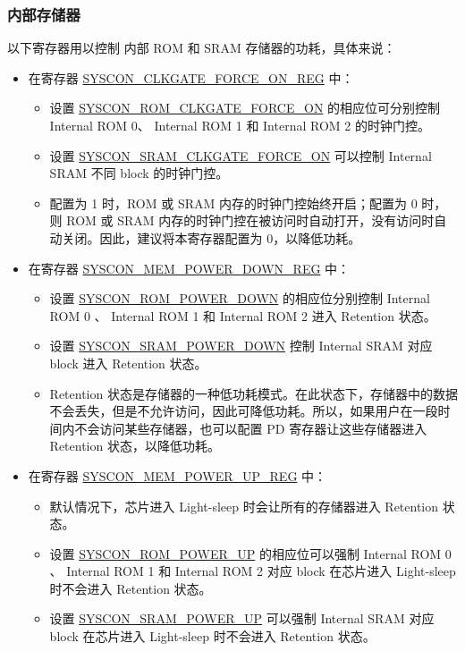 \documentclass[main\_\_CN.tex]{subfiles}
\begin{document}
\subsubsection{内部存储器}

以下寄存器用以控制 \chipname{} 内部 ROM 和 SRAM 存储器的功耗，具体来说：

\begin{itemize}
    \item 在寄存器 \hyperref[regdescSYSCONCLKGATEFORCEONREG]{SYSCON\_CLKGATE\_FORCE\_ON\_REG} 中：
    \begin{itemize}
        \item 设置 \hyperref[fielddescSYSCONROMCLKGATEFORCEON]{SYSCON\_ROM\_CLKGATE\_FORCE\_ON} 的相应位可分别控制 Internal ROM 0、 Internal ROM 1 和 Internal ROM 2 的时钟门控。
        \item 设置 \hyperref[fielddescSYSCONSRAMCLKGATEFORCEON]{SYSCON\_SRAM\_CLKGATE\_FORCE\_ON} 可以控制 Internal SRAM 不同 block 的时钟门控。
        \item 配置为 1 时，ROM 或 SRAM 内存的时钟门控始终开启；配置为 0 时，则 ROM 或 SRAM 内存的时钟门控在被访问时自动打开，没有访问时自动关闭。因此，建议将本寄存器配置为 0，以降低功耗。
    \end{itemize}
    \item 在寄存器 \hyperref[regdescSYSCONMEMPOWERDOWNREG]{SYSCON\_MEM\_POWER\_DOWN\_REG} 中：
    \begin{itemize}
        \item 设置 \hyperref[fielddescSYSCONROMPOWERDOWN]{SYSCON\_ROM\_POWER\_DOWN} 的相应位分别控制 Internal ROM 0 、 Internal ROM 1 和 Internal ROM 2 进入 Retention 状态。
        \item 设置 \hyperref[fielddescSYSCONSRAMPOWERDOWN]{SYSCON\_SRAM\_POWER\_DOWN} 控制 Internal SRAM 对应 block 进入 Retention 状态。
        \item Retention 状态是存储器的一种低功耗模式。在此状态下，存储器中的数据不会丢失，但是不允许访问，因此可降低功耗。所以，如果用户在一段时间内不会访问某些存储器，也可以配置 PD 寄存器让这些存储器进入 Retention 状态，以降低功耗。
    \end{itemize}
    \item 在寄存器 \hyperref[regdescSYSCONMEMPOWERUPREG]{SYSCON\_MEM\_POWER\_UP\_REG} 中：
    \begin{itemize}
        \item 默认情况下，芯片进入 Light-sleep 时会让所有的存储器进入 Retention 状态。
        \item 设置 \hyperref[fielddescSYSCONROMPOWERUP]{SYSCON\_ROM\_POWER\_UP} 的相应位可以强制 Internal ROM 0 、 Internal ROM 1 和 Internal ROM 2 对应 block 在芯片进入 Light-sleep 时不会进入 Retention 状态。
        \item 设置 \hyperref[fielddescSYSCONSRAMPOWERUP]{SYSCON\_SRAM\_POWER\_UP} 可以强制 Internal SRAM 对应 block 在芯片进入 Light-sleep 时不会进入 Retention 状态。
    \end{itemize}
\end{itemize}
\end{document}

